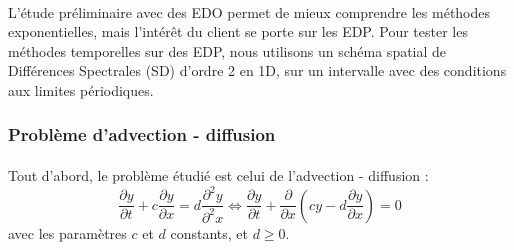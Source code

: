     \paragraph{}
    L'étude préliminaire avec des EDO permet de mieux comprendre les méthodes exponentielles, mais l'intérêt du client se porte sur les EDP. Pour tester les méthodes temporelles sur des EDP, nous utilisons un schéma spatial de Différences Spectrales (SD) d'ordre 2 en 1D, sur un intervalle avec des conditions aux limites périodiques.

    \subsubsection{Problème d'advection - diffusion}
        \paragraph{}
        Tout d'abord, le problème étudié est celui de l'advection - diffusion :
        \begin{equation}
            \frac{\partial y}{\partial t} + c\frac{\partial y}{\partial x} = d\frac{\partial^2 y}{\partial^2 x}
            \Longleftrightarrow \frac{\partial y}{\partial t} + \frac{\partial}{\partial x}\left(cy - d\frac{\partial y}{\partial x}\right) = 0
            \label{eq:edp_advection_diffusion}
        \end{equation}
        avec les paramètres $c$ et $d$ constants, et $d \ge 0$.
